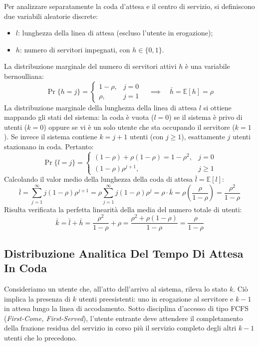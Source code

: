 \documentclass[11pt, a4paper]{article}
\begin{document}
Per analizzare separatamente la coda d'attesa e il centro di servizio, si definiscono due variabili aleatorie discrete:
\begin{itemize}[noitemsep]
    \item $l$: lunghezza della linea di attesa (escluso l'utente in erogazione);
    \item $h$: numero di servitori impegnati, con $h \in \{0, 1\}$.
\end{itemize}
La distribuzione marginale del numero di servitori attivi $h$ è una variabile bernoulliana:
\[
\Pr\{h = j\} =
\begin{cases}
1 - \rho, & j = 0 \\
\rho, & j = 1
\end{cases}
\quad \implies \quad \bar{h} = \mathbb{E}[h] = \rho
\]
La distribuzione marginale della lunghezza della linea di attesa $l$ si ottiene mappando gli stati del sistema: la coda è vuota ($l=0$) se il sistema è privo di utenti ($k=0$) oppure se vi è un solo utente che sta occupando il servitore ($k=1$). Se invece il sistema contiene $k = j+1$ utenti (con $j \ge 1$), esattamente $j$ utenti stazionano in coda. Pertanto:
\[
\Pr\{l = j\} =
\begin{cases}
(1 - \rho) + \rho(1 - \rho) = 1 - \rho^2, & j = 0 \\
(1 - \rho)\rho^{j+1}, & j \ge 1
\end{cases}
\]
Calcolando il valor medio della lunghezza della coda di attesa $\bar{l} = \mathbb{E}[l]$:
\[
\bar{l} = \sum_{j=1}^{\infty} j (1 - \rho)\rho^{j+1} = \rho \sum_{j=1}^{\infty} j (1 - \rho)\rho^j = \rho \cdot \bar{k} = \rho \left( \frac{\rho}{1 - \rho} \right) = \frac{\rho^2}{1 - \rho}
\]
Risulta verificata la perfetta linearità della media del numero totale di utenti:
\[
\boxed{\bar{k} = \bar{l} + \bar{h} = \frac{\rho^2}{1 - \rho} + \rho = \frac{\rho^2 + \rho(1 - \rho)}{1 - \rho} = \frac{\rho}{1 - \rho}}
\]

\subsection{Distribuzione Analitica Del Tempo Di Attesa In Coda}

Consideriamo un utente che, all'atto dell'arrivo al sistema, rileva lo stato $k$. Ciò implica la presenza di $k$ utenti preesistenti: uno in erogazione al servitore e $k-1$ in attesa lungo la linea di accodamento. Sotto disciplina d'accesso di tipo FCFS (\emph{First-Come, First-Served}), l'utente entrante deve attendere il completamento della frazione residua del servizio in corso più il servizio completo degli altri $k-1$ utenti che lo precedono.
\end{document}
